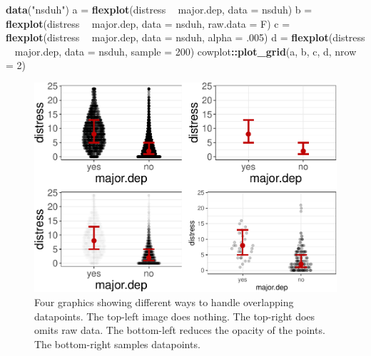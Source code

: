 \documentclass[
  doc]{apa6}
\newenvironment{Shaded}{\begin{snugshade}}{\end{snugshade}}
\newcommand{\DataTypeTok}[1]{\textcolor[rgb]{0.13,0.29,0.53}{#1}}
\newcommand{\DecValTok}[1]{\textcolor[rgb]{0.00,0.00,0.81}{#1}}
\newcommand{\FloatTok}[1]{\textcolor[rgb]{0.00,0.00,0.81}{#1}}
\newcommand{\KeywordTok}[1]{\textcolor[rgb]{0.13,0.29,0.53}{\textbf{#1}}}
\newcommand{\NormalTok}[1]{#1}
\newcommand{\OperatorTok}[1]{\textcolor[rgb]{0.81,0.36,0.00}{\textbf{#1}}}
\newcommand{\StringTok}[1]{\textcolor[rgb]{0.31,0.60,0.02}{#1}}
\begin{document}
\begin{Shaded}
\begin{Highlighting}[]
\KeywordTok{data}\NormalTok{(}\StringTok{"nsduh"}\NormalTok{)}
\NormalTok{a =}\StringTok{ }\KeywordTok{flexplot}\NormalTok{(distress }\OperatorTok{~}\StringTok{ }\NormalTok{major.dep, }\DataTypeTok{data =}\NormalTok{ nsduh)}
\NormalTok{b =}\StringTok{ }\KeywordTok{flexplot}\NormalTok{(distress }\OperatorTok{~}\StringTok{ }\NormalTok{major.dep, }\DataTypeTok{data =}\NormalTok{ nsduh, }\DataTypeTok{raw.data =}\NormalTok{ F)}
\NormalTok{c =}\StringTok{ }\KeywordTok{flexplot}\NormalTok{(distress }\OperatorTok{~}\StringTok{ }\NormalTok{major.dep, }\DataTypeTok{data =}\NormalTok{ nsduh, }\DataTypeTok{alpha =} \FloatTok{.005}\NormalTok{)}
\NormalTok{d =}\StringTok{ }\KeywordTok{flexplot}\NormalTok{(distress }\OperatorTok{~}\StringTok{ }\NormalTok{major.dep, }\DataTypeTok{data =}\NormalTok{ nsduh, }\DataTypeTok{sample =} \DecValTok{200}\NormalTok{)}
\NormalTok{cowplot}\OperatorTok{::}\KeywordTok{plot_grid}\NormalTok{(a, b, c, d, }\DataTypeTok{nrow =} \DecValTok{2}\NormalTok{)}
\end{Highlighting}
\end{Shaded}

\begin{figure}
\centering
\includegraphics{flexplot_psychmeth_files/figure-latex/sample-1.pdf}
\caption{\label{fig:sample}Four graphics showing different ways to handle overlapping datapoints. The top-left image does nothing. The top-right does omits raw data. The bottom-left reduces the opacity of the points. The bottom-right samples datapoints. \label{fig:sample}}
\end{figure}
\end{document}
